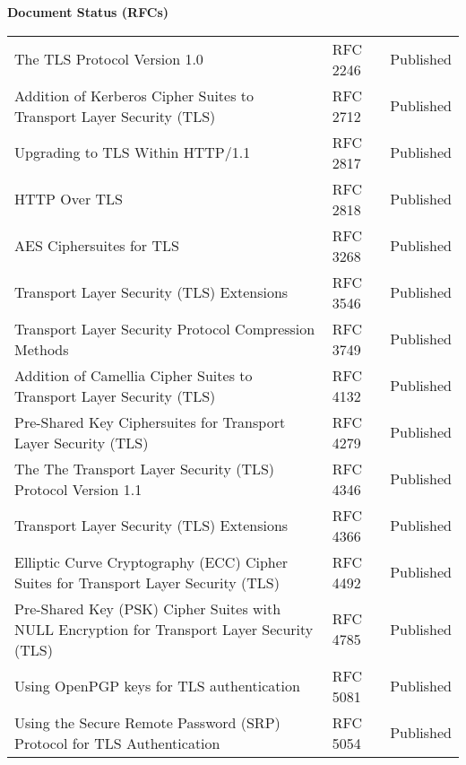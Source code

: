 \documentclass[helvetica]{seminar}
\newcommand{\heading}[1]{%
  \begin{center} 
    \large\bf 
    #1 
  \end{center} 
  \vspace{.4 in}}
\begin{document}
\begin{slide}
\heading{Document Status (RFCs)}

\vspace{-.2 in}

{\tiny
\begin{tabular}{|p{1.5 in}|p{1.4 in}|p{.7 in}|}
\hline
The TLS Protocol Version 1.0  & RFC 2246 & Published \\
Addition of Kerberos Cipher Suites to Transport Layer Security (TLS)  & RFC 2712 & Published \\
Upgrading to TLS Within HTTP/1.1  & RFC 2817 & Published \\
HTTP Over TLS  & RFC 2818 & Published \\
AES Ciphersuites for TLS  & RFC 3268 & Published \\
Transport Layer Security (TLS) Extensions  & RFC 3546 & Published \\
Transport Layer Security Protocol Compression Methods  & RFC 3749 & Published \\
Addition of Camellia Cipher Suites to Transport Layer Security (TLS)  & RFC 4132 & Published \\
Pre-Shared Key Ciphersuites for Transport Layer Security (TLS)  & RFC 4279 & Published \\
The The Transport Layer Security (TLS) Protocol Version 1.1  & RFC 4346 & Published \\
Transport Layer Security (TLS) Extensions  & RFC 4366 & Published \\
Elliptic Curve Cryptography (ECC) Cipher Suites for Transport Layer Security (TLS)  & RFC 4492 & Published \\
Pre-Shared Key (PSK) Cipher Suites with NULL Encryption for Transport Layer Security (TLS)  & RFC 4785 & Published \\
Using OpenPGP keys for TLS authentication  & RFC 5081 & Published \\
Using the Secure Remote Password (SRP) Protocol for TLS Authentication  & RFC 5054 & Published \\
\hline
\end{tabular}
}
\end{slide}
\end{document}
